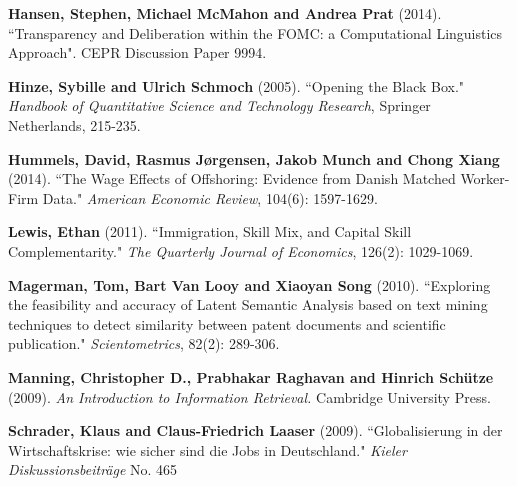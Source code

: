 \documentclass[11pt,a4paper]{article}
\begin{document}
\begin{thebibliography}{9}
	 \textbf{Hansen, Stephen, Michael McMahon and Andrea Prat} (2014). ``Transparency and Deliberation within the FOMC:
a Computational Linguistics Approach". CEPR Discussion Paper 9994.

	 \textbf{Hinze, Sybille and Ulrich Schmoch} (2005). ``Opening the Black Box." \textit{Handbook of Quantitative Science and Technology Research}, Springer Netherlands, 215-235.
	
	 \textbf{Hummels, David, Rasmus Jørgensen, Jakob Munch and Chong Xiang} (2014). ``The Wage Effects of Offshoring: Evidence from Danish Matched Worker-Firm Data." \textit{American Economic Review}, 104(6): 1597-1629.
	
	 \textbf{Lewis, Ethan} (2011). ``Immigration, Skill Mix, and Capital Skill Complementarity." \textit{The Quarterly Journal of Economics}, 126(2): 1029-1069.
	
	
	 \textbf{Magerman, Tom, Bart Van Looy and Xiaoyan Song} (2010). ``Exploring the feasibility and accuracy of Latent Semantic Analysis based on text mining techniques to detect similarity between patent documents and scientific publication." \textit{Scientometrics}, 82(2): 289-306.	

	 \textbf{Manning, Christopher D., Prabhakar Raghavan and Hinrich Schütze} (2009). \textit{An Introduction to Information Retrieval.}  Cambridge University Press.
	
	 \textbf{Schrader, Klaus and Claus-Friedrich Laaser} (2009). ``Globalisierung in der Wirtschaftskrise: wie sicher sind die Jobs in Deutschland." \textit{Kieler Diskussionsbeiträge} No. 465
	
		
\end{thebibliography}





\end{document}
